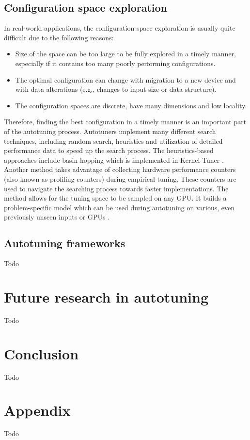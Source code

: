 \documentclass[
  digital,     %
  oneside,     %
  nosansbold,  %
  nocolorbold, %
  lof,         %
  lot,         %
  nocover
]{fithesis4}
\begin{document}
\section{Configuration space exploration}
In real-world applications, the configuration space exploration is usually quite difficult due to the following reasons:

\begin{itemize}
	\item Size of the space can be too large to be fully explored in a timely manner, especially if it contains too many poorly performing configurations.
	\item The optimal configuration can change with migration to a new device and with data alterations (e.g., changes to input size or data structure).
	\item The configuration spaces are discrete, have many dimensions and low locality.
\end{itemize}

Therefore, finding the best configuration in a timely manner is an important part of the autotuning process. Autotuners implement many different search techniques, including random search, heuristics and utilization of detailed performance data to speed up the search process. The heuristics-based approaches include basin hopping which is implemented in Kernel Tuner \cite{vanwerkhoven2018kernel}. Another method takes advantage of collecting hardware performance counters (also known as profiling counters) during empirical tuning. These counters are used to navigate the searching process towards faster implementations. The method allows for the tuning space to be sampled on any GPU. It builds a problem-specific model which can be used during autotuning on various, even previously unseen inputs or GPUs \cite{filipovic2022using}.

\section{Autotuning frameworks}
Todo

\chapter{Future research in autotuning}
Todo

\chapter{Conclusion}
Todo

\nocite{*}
\printbibliography[heading=bibintoc]

\appendix
\chapter{Appendix}
Todo
\end{document}
